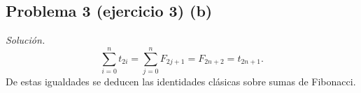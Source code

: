 \subsection*{Problema 3 (ejercicio 3) (b)}
\emph{Solución.}
\[
\sum_{i=0}^n t_{2i}
= \sum_{j=0}^n F_{2j+1}
= F_{2n+2}
= t_{2n+1}.
\]
De estas igualdades se deducen las identidades clásicas sobre sumas de Fibonacci.
